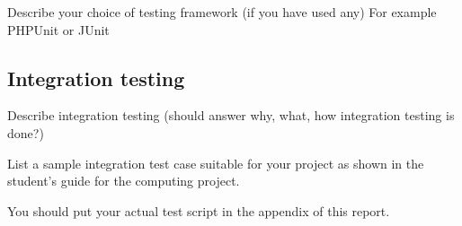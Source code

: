 Describe your choice of testing framework (if you have used any) For example PHPUnit or JUnit


\subsection{Integration testing} %
\label{sub:integration_testing}
Describe integration testing (should answer why, what, how integration testing is done?)

List a sample integration test case suitable for your project as shown in the student's guide for the computing project.

You should put your actual test script in the appendix of this report.
